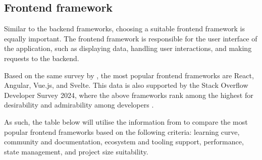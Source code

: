 \subsection{Frontend framework}

Similar to the backend frameworks, choosing a suitable frontend framework is equally important. The frontend framework is responsible for the user interface of the application, such as displaying data, handling user interactions, and making requests to the backend. 

Based on the same survey by \textcite{statista-webframeworks}, the most popular frontend frameworks are React, Angular, Vue.js, and Svelte. This data is also supported by the Stack Overflow Developer Survey 2024, where the above frameworks rank among the highest for desirability and admirability among developers \parencite{stackoverflow}.

As such, the table below will utilise the information from \textcite{react,angular,vue,svelte} to compare the most popular frontend frameworks based on the following criteria: learning curve, community and documentation, ecosystem and tooling support, performance, state management, and project size suitability.

\begin{table}[h]
    \centering
    \caption{Comparison of frontend frameworks}
    \label{tab:frontend}
\end{table}

